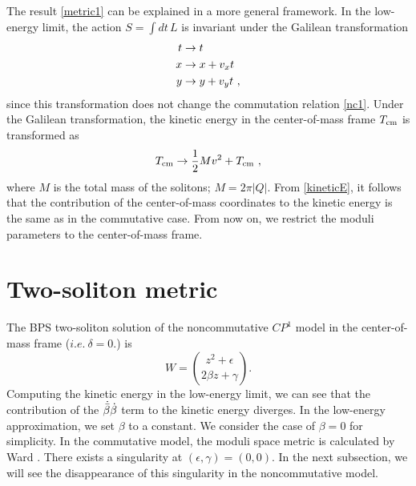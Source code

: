 \documentclass[a4paper,12pt]{article}
\begin{document}
The result \eqref{metric1} can be explained in a more general framework.
In the low-energy limit, the action $S=\int\!dt\,L$ is invariant 
under the Galilean transformation
\begin{align}
t&\to t\notag\\
x&\to x+v_x t\\
y&\to y+v_y t\ ,\notag
\end{align}
since this transformation does not change the commutation 
relation \eqref{nc1}. Under the Galilean transformation, 
the kinetic energy in the center-of-mass frame %
$T_{{\rm cm}}$ is transformed as
\begin{equation}
T_{{\rm cm}}\to \frac{1}{2}Mv^2+T_{{\rm cm}} \ ,\label{kineticE}
\end{equation}
where $M$ is the total mass of the solitons; $M=2\pi |Q|$. From \eqref{kineticE}, 
it follows that the contribution of the 
center-of-mass coordinates to the kinetic energy is the same as in 
the commutative case. From now on, we restrict the moduli 
parameters to the center-of-mass frame.

\section{Two-soliton metric}
The BPS two-soliton solution of the noncommutative $CP^1$ model in the center-of-mass frame 
($i.e.\ \delta=0$.) is
\begin{equation}
W=\binom{z^2+\epsilon}{2\beta z+\gamma}.\label{W2}
\end{equation}
Computing the kinetic energy in the low-energy limit, we can see that
the contribution of the $\Dot{\Bar{\beta}}\dot{\beta}$
term to the kinetic energy diverges. In the low-energy approximation, 
we set $\beta$ to a constant.
We consider the case of $\beta=0$ for simplicity. 
In the commutative model, the moduli space metric is calculated 
by Ward \cite{Ward}. There exists a singularity at $(\epsilon, \gamma)
=(0,0)$. 
In the next subsection, 
we will see the disappearance of this singularity in the 
noncommutative model.
\end{document}
